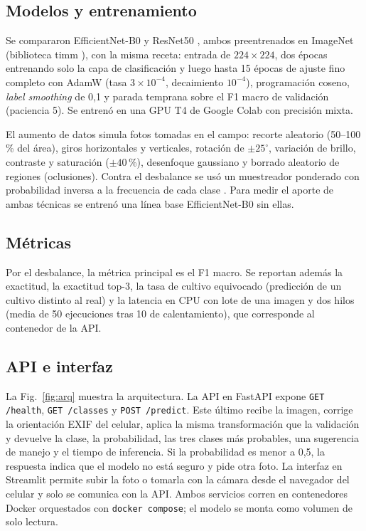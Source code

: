 \documentclass[conference]{IEEEtran}
\begin{document}
\begin{table}[t]
\caption{Conjunto de datos unificado (im\'agenes por partici\'on)}
\label{tab:dataset}
\centering\small

\end{table}

\subsection{Modelos y entrenamiento}
Se compararon EfficientNet-B0 \cite{tan2019efficientnet} y ResNet50 \cite{he2016resnet}, ambos preentrenados en ImageNet (biblioteca timm \cite{wightman2019timm}), con la misma receta: entrada de $224\times224$, dos \'epocas entrenando solo la capa de clasificaci\'on y luego hasta 15 \'epocas de ajuste fino completo con AdamW (tasa $3\times10^{-4}$, decaimiento $10^{-4}$), programaci\'on coseno, \textit{label smoothing} de 0,1 y parada temprana sobre el F1 macro de validaci\'on (paciencia 5). Se entren\'o en una GPU T4 de Google Colab con precisi\'on mixta.

El aumento de datos simula fotos tomadas en el campo: recorte aleatorio (50--100\,\% del \'area), giros horizontales y verticales, rotaci\'on de $\pm25^{\circ}$, variaci\'on de brillo, contraste y saturaci\'on ($\pm40$\,\%), desenfoque gaussiano y borrado aleatorio de regiones (oclusiones). Contra el desbalance se us\'o un muestreador ponderado con probabilidad inversa a la frecuencia de cada clase \cite{buda2018imbalance}. Para medir el aporte de ambas t\'ecnicas se entren\'o una l\'inea base EfficientNet-B0 sin ellas.

\subsection{M\'etricas}
Por el desbalance, la m\'etrica principal es el F1 macro. Se reportan adem\'as la exactitud, la exactitud top-3, la tasa de cultivo equivocado (predicci\'on de un cultivo distinto al real) y la latencia en CPU con lote de una imagen y dos hilos (media de 50 ejecuciones tras 10 de calentamiento), que corresponde al contenedor de la API.

\subsection{API e interfaz}
La Fig.~\ref{fig:arq} muestra la arquitectura. La API en FastAPI expone \texttt{GET /health}, \texttt{GET /classes} y \texttt{POST /predict}. Este \'ultimo recibe la imagen, corrige la orientaci\'on EXIF del celular, aplica la misma transformaci\'on que la validaci\'on y devuelve la clase, la probabilidad, las tres clases m\'as probables, una sugerencia de manejo y el tiempo de inferencia. Si la probabilidad es menor a 0,5, la respuesta indica que el modelo no est\'a seguro y pide otra foto. La interfaz en Streamlit permite subir la foto o tomarla con la c\'amara desde el navegador del celular y solo se comunica con la API. Ambos servicios corren en contenedores Docker orquestados con \texttt{docker compose}; el modelo se monta como volumen de solo lectura.
\end{document}

